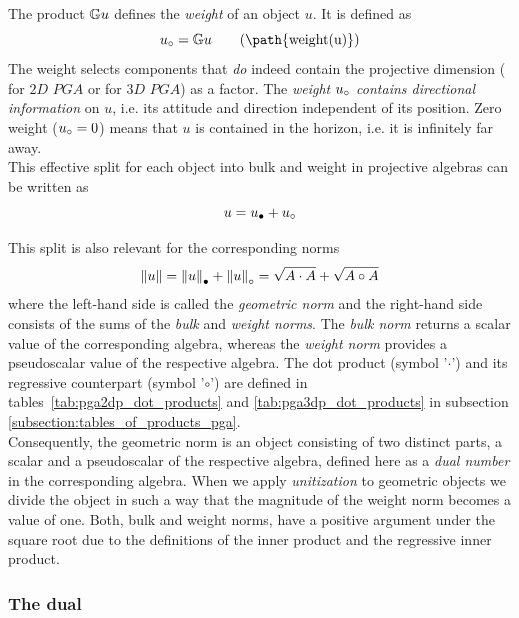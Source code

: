 The product $\mathbf{\mathbb{G}} u$ defines the \emph{weight} of an object $u$. It is defined as
\begin{equation}
    \weight{u} = \rmetric{G} u \qquad \textrm{(\path{weight(u)})}
\end{equation}
The weight selects components that \emph{do} indeed contain the projective dimension
( for $2D$ $PGA$ or  for $3D$ $PGA$) as a factor. The \emph{weight
${u}_\circ$ contains directional information} on $u$, i.e. its attitude and direction
independent of its position. Zero weight (${u}_\circ = 0$) means that $u$ is contained in
the horizon, i.e. it is infinitely far away.\\

This effective split for each object into bulk and weight in projective algebras can be
written as
\begin{equation}
    u = {u}_\bullet + {u}_\circ
\end{equation}

This split is also relevant for the corresponding norms
\begin{equation}
    \left \lVert {u} \right \rVert = {\left \lVert {u} \right \rVert}_\bullet + {\left \lVert {u} \right \rVert}_\circ = \sqrt{A \cdot A} + \sqrt{A \circ A}
\end{equation}
where the left-hand side is called the \emph{geometric norm} and the right-hand side
consists of the sums of the \emph{bulk} and \emph{weight norms}. The \emph{bulk norm}
returns a scalar value of the corresponding algebra, whereas the \emph{weight norm}
provides a pseudoscalar value of the respective algebra. The dot product (symbol
'$\cdot$') and its regressive counterpart (symbol '$\circ$') are defined in
tables~\ref{tab:pga2dp_dot_products} and \ref{tab:pga3dp_dot_products} in subsection
\ref{subsection:tables_of_products_pga}. \\

Consequently, the geometric norm is an object consisting of two distinct parts, a scalar
and a pseudoscalar of the respective algebra, defined here as a \emph{dual number} in the
corresponding algebra. When we apply \emph{unitization} to geometric objects we divide the
object in such a way that the magnitude of the weight norm becomes a value of one. Both,
bulk and weight norms, have a positive argument under the square root due to the
definitions of the inner product and the regressive inner product.


\subsubsection{The dual}
\label{subsection:dual}

